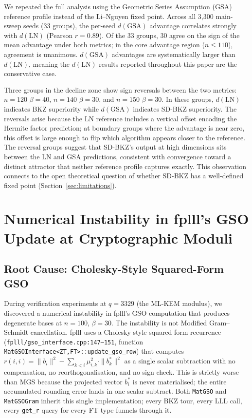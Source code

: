 \documentclass[journal=cic,version=preprint]{iacrj}
\begin{document}
We repeated the full analysis using the Geometric Series Assumption (GSA) reference profile instead of the Li--Nguyen fixed point. Across all 3{,}300 main-sweep seeds (33 groups), the per-seed $d(\mathrm{GSA})$ advantage correlates strongly with $d(\mathrm{LN})$ (Pearson $r=0.89$). Of the 33 groups, 30 agree on the sign of the mean advantage under both metrics; in the core advantage region ($n\leq 110$), agreement is unanimous. $d(\mathrm{GSA})$ advantages are systematically larger than $d(\mathrm{LN})$, meaning the $d(\mathrm{LN})$ results reported throughout this paper are the conservative case.

Three groups in the decline zone show sign reversals between the two metrics: $n=120$ $\beta=40$, $n=140$ $\beta=30$, and $n=150$ $\beta=30$. In these groups, $d(\mathrm{LN})$ indicates BKZ superiority while $d(\mathrm{GSA})$ indicates SD-BKZ superiority. The reversals arise because the LN reference includes a vertical offset encoding the Hermite factor prediction; at boundary groups where the advantage is near zero, this offset is large enough to flip which algorithm appears closer to the reference. The reversal groups suggest that SD-BKZ's output at high dimensions sits between the LN and GSA predictions, consistent with convergence toward a distinct attractor that neither reference profile captures exactly. This observation connects to the open theoretical question of whether SD-BKZ has a well-defined fixed point (Section~\ref{sec:limitations}).

\section{Numerical Instability in fplll's GSO Update at Cryptographic Moduli}
\label{sec:q3329}

\subsection{Root Cause: Cholesky-Style Squared-Form GSO}

During verification experiments at $q=3329$ (the ML-KEM modulus), we discovered a numerical instability in fplll's GSO computation that produces degenerate bases at $n=100$, $\beta=30$. The instability is not Modified Gram--Schmidt cancellation. fplll uses a Cholesky-style squared-form recurrence (\texttt{fplll/gso\_interface.cpp:147--151}, function \texttt{MatGSOInterface<ZT,FT>::update\_gso\_row}) that computes $r(i,i) = \|b_i\|^2 - \sum_{k<i} \mu_{i,k}^2 \cdot \|b^*_k\|^2$ as a single scalar subtraction with no compensation, no reorthogonalisation, and no sign check. This is strictly worse than MGS because the projected vector $b^*_i$ is never materialised; the entire accumulated rounding error lands in one scalar subtract. Both \texttt{MatGSO} and \texttt{MatGSOGram} inherit this single implementation; every BKZ tour, every LLL call, every \texttt{get\_r} query for every FT type funnels through it.
\end{document}
